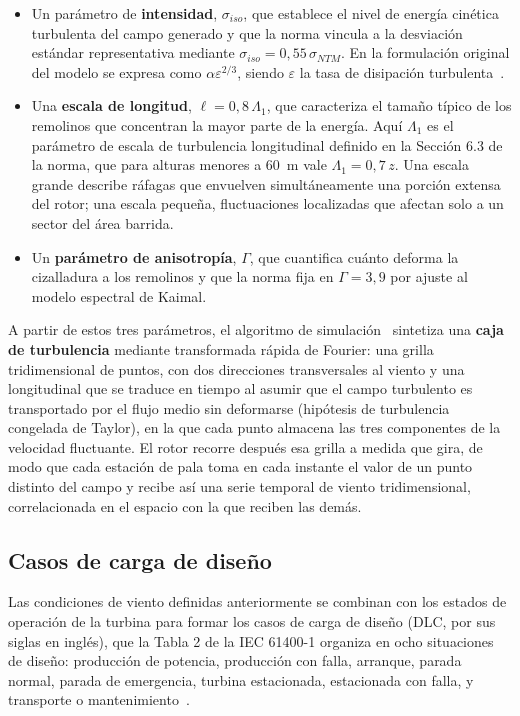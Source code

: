 \begin{itemize}
    \item Un parámetro de \textbf{intensidad}, $\sigma_{iso}$, que establece el nivel de energía cinética turbulenta del campo generado y que la norma vincula a la desviación estándar representativa mediante $\sigma_{iso} = 0{,}55\,\sigma_{NTM}$. En la formulación original del modelo se expresa como $\alpha\varepsilon^{2/3}$, siendo $\varepsilon$ la tasa de disipación turbulenta~\parencite{Mann1994}.
    \item Una \textbf{escala de longitud}, $\ell = 0{,}8\,\Lambda_1$, que caracteriza el tamaño típico de los remolinos que concentran la mayor parte de la energía. Aquí $\Lambda_1$ es el parámetro de escala de turbulencia longitudinal definido en la Sección 6.3 de la norma, que para alturas menores a $60$~m vale $\Lambda_1 = 0{,}7\,z$. Una escala grande describe ráfagas que envuelven simultáneamente una porción extensa del rotor; una escala pequeña, fluctuaciones localizadas que afectan solo a un sector del área barrida.
    \item Un \textbf{parámetro de anisotropía}, $\Gamma$, que cuantifica cuánto deforma la cizalladura a los remolinos y que la norma fija en $\Gamma = 3{,}9$ por ajuste al modelo espectral de Kaimal.
\end{itemize}

A partir de estos tres parámetros, el algoritmo de simulación~\parencite{Mann1998} sintetiza una \textbf{caja de turbulencia} mediante transformada rápida de Fourier: una grilla tridimensional de puntos, con dos direcciones transversales al viento y una longitudinal que se traduce en tiempo al asumir que el campo turbulento es transportado por el flujo medio sin deformarse (hipótesis de turbulencia congelada de Taylor), en la que cada punto almacena las tres componentes de la velocidad fluctuante. El rotor recorre después esa grilla a medida que gira, de modo que cada estación de pala toma en cada instante el valor de un punto distinto del campo y recibe así una serie temporal de viento tridimensional, correlacionada en el espacio con la que reciben las demás.

\subsection{Casos de carga de diseño}
\label{sec:dlc_seleccion}

Las condiciones de viento definidas anteriormente se combinan con los estados de operación de la turbina para formar los casos de carga de diseño (DLC, por sus siglas en inglés), que la Tabla 2 de la IEC 61400-1 organiza en ocho situaciones de diseño: producción de potencia, producción con falla, arranque, parada normal, parada de emergencia, turbina estacionada, estacionada con falla, y transporte o mantenimiento~\parencite*{IEC61400-1}.

